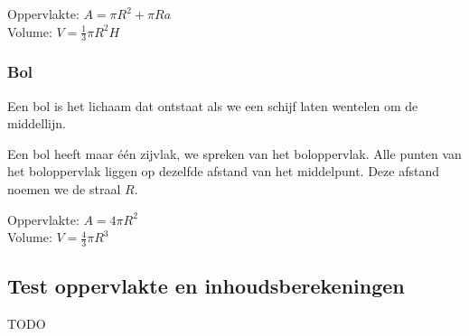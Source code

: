 


		
\begin{ftonthoud}
			Oppervlakte: $A=\pi R^2 + \pi R a$ 
		\\
		Volume: $V=\frac{1}{3}\pi R^2 H$
\end{ftonthoud}

\subsubsection{Bol}
\begin{definitie}
	Een bol is het lichaam dat ontstaat als we een schijf laten wentelen om de middellijn.
\end{definitie} Een bol heeft maar \'e\'en zijvlak, we spreken van het boloppervlak. 
Alle punten van het boloppervlak liggen op dezelfde afstand van het middelpunt. Deze afstand noemen we de straal $R$.




		
\begin{ftonthoud}
			Oppervlakte: $A=4\pi R^2$
		\\
		Volume: $V=\frac{4}{3}\pi R^3$
\end{ftonthoud}


\subsection{Test oppervlakte en inhoudsberekeningen}
TODO